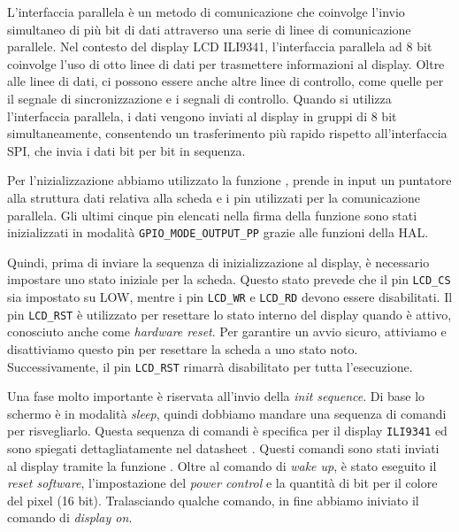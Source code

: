 \documentclass[a4paper]{article}
\begin{document}
L'interfaccia parallela è un metodo di comunicazione che coinvolge l'invio simultaneo di più bit di dati attraverso una serie di linee di comunicazione parallele. Nel contesto del display LCD ILI9341, l'interfaccia parallela ad 8 bit coinvolge l'uso di otto linee di dati per trasmettere informazioni al display. Oltre alle linee di dati, ci possono essere anche altre linee di controllo, come quelle per il segnale di sincronizzazione e i segnali di controllo. Quando si utilizza l'interfaccia parallela, i dati vengono inviati al display in gruppi di 8 bit simultaneamente, consentendo un trasferimento più rapido rispetto all'interfaccia SPI, che invia i dati bit per bit in sequenza.

Per l'nizializzazione abbiamo utilizzato la funzione {}, prende in input un puntatore alla struttura dati relativa alla scheda e i pin utilizzati per la comunicazione parallela. Gli ultimi cinque pin elencati nella firma della funzione sono stati inizializzati in modalità \texttt{GPIO\_MODE\_OUTPUT\_PP} grazie alle funzioni della HAL.

Quindi, prima di inviare la sequenza di inizializzazione al display, è necessario impostare uno stato iniziale per la scheda. Questo stato prevede che il pin \texttt{LCD\_CS} sia impostato su LOW, mentre i pin \texttt{LCD\_WR} e \texttt{LCD\_RD} devono essere disabilitati. Il pin \texttt{LCD\_RST} è utilizzato per resettare lo stato interno del display quando è attivo, conosciuto anche come \textit{hardware reset}. Per garantire un avvio sicuro, attiviamo e disattiviamo questo pin per resettare la scheda a uno stato noto. Successivamente, il pin \texttt{LCD\_RST} rimarrà disabilitato per tutta l'esecuzione.

Una fase molto importante è riservata all'invio della \textit{init sequence}.
Di base lo schermo è in modalità \textit{sleep}, quindi dobbiamo mandare una sequenza di comandi per risvegliarlo. Questa sequenza di comandi è specifica per il display \texttt{ILI9341} ed sono spiegati dettagliatamente nel datasheet \cite{ili9341}. Questi comandi sono stati inviati al display tramite la funzione {}. Oltre al comando di \textit{wake up}, è stato eseguito il \textit{reset software}, l'impostazione del \textit{power control} e la quantità di bit per il colore del pixel (16 bit). Tralasciando qualche comando, in fine abbiamo iniviato il comando di \textit{display on}.
\end{document}
